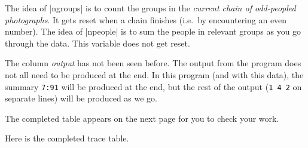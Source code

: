 The idea of \pycode|ngroups| is to count the groups in the \emph{current chain of
odd-peopled photographs}. It gets reset when a chain finishes (i.e.~by encountering an
even number). The idea of \pycode|npeople| is to sum the people in relevant groups as you
go through the data. This variable does not get reset.

The column \emph{output} has not been seen before. The output from the program does not
all need to be produced at the end. In this program (and with this data), the summary
\texttt{7:91} will be produced at the end, but the rest of the output (\texttt{1\ 4\ 2} on
separate lines) will be produced as we go.

The completed table appears on the next page for you to check your work.


\clearpage %

Here is the completed trace table.

